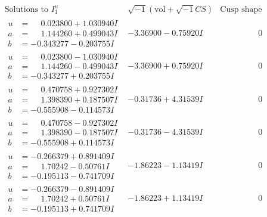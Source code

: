 \documentclass[1p]{elsarticle_modified}
\theoremstyle{definition}
\newcommand{\I}{\sqrt{-1}}
\begin{document}
$$\begin{array}{c|c|c}  
\text{Solutions to }I^u_{1}& \I (\text{vol} + \sqrt{-1}CS) & \text{Cusp shape}\\
 \hline 
\begin{aligned}
u &= \phantom{-}0.023800 + 1.030940 I \\
a &= \phantom{-}1.144260 + 0.499043 I \\
b &= -0.343277 - 0.203755 I\end{aligned}
 & -3.36900 - 0.75920 I & \phantom{-0.000000 } 0 \\ \hline\begin{aligned}
u &= \phantom{-}0.023800 - 1.030940 I \\
a &= \phantom{-}1.144260 - 0.499043 I \\
b &= -0.343277 + 0.203755 I\end{aligned}
 & -3.36900 + 0.75920 I & \phantom{-0.000000 } 0 \\ \hline\begin{aligned}
u &= \phantom{-}0.470758 + 0.927302 I \\
a &= \phantom{-}1.398390 + 0.187507 I \\
b &= -0.555908 - 0.114573 I\end{aligned}
 & -0.31736 + 4.31539 I & \phantom{-0.000000 } 0 \\ \hline\begin{aligned}
u &= \phantom{-}0.470758 - 0.927302 I \\
a &= \phantom{-}1.398390 - 0.187507 I \\
b &= -0.555908 + 0.114573 I\end{aligned}
 & -0.31736 - 4.31539 I & \phantom{-0.000000 } 0 \\ \hline\begin{aligned}
u &= -0.266379 + 0.891409 I \\
a &= \phantom{-}1.70242 - 0.50761 I \\
b &= -0.195113 - 0.741709 I\end{aligned}
 & -1.86223 - 1.13419 I & \phantom{-0.000000 } 0 \\ \hline\begin{aligned}
u &= -0.266379 - 0.891409 I \\
a &= \phantom{-}1.70242 + 0.50761 I \\
b &= -0.195113 + 0.741709 I\end{aligned}
 & -1.86223 + 1.13419 I & \phantom{-0.000000 } 0 \\ \hline\begin{aligned}

\end{aligned}
\end{array}$$
\end{document}
